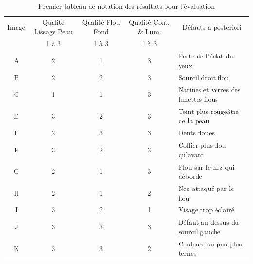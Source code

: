 \documentclass[11pt, french,screen]{report-rd-info}
\begin{document}
\begin{table}[htbp]
\centering
\caption{Premier tableau de notation des résultats pour l'évaluation}
\begin{tabular}{|c|c|c|c|p{3cm}|}
\hline
\multicolumn{ 1}{|c|}{Image} & Qualité Lissage Peau & Qualité Flou Fond & Qualité Cont. \& Lum. & \multicolumn{ 1}{c|}{Défauts a posteriori} \\ \cline{ 2- 4}
\multicolumn{ 1}{|c|}{} & 1 à 3 & 1 à 3 & 1 à 3 & \multicolumn{ 1}{c|}{} \\ \hline
A & 2 & 1 & 3 & Perte de l'éclat des yeux \\ \hline
B & 2 & 2 & 3 & Sourcil droit flou \\ \hline
C & 1 & 1 & 3 & Narines et verres des lunettes flous \\ \hline
D & 3 & 2 & 3 & Teint plus rougeâtre de la peau \\ \hline
E & 2 & 3 & 3 & Dents floues \\ \hline
F & 3 & 2 & 3 & Collier plus flou qu'avant \\ \hline
G & 2 & 1 & 3 & Flou sur le nez qui déborde \\ \hline
H & 2 & 1 & 2 & Nez  attaqué par le flou \\ \hline
I & 3 & 2 & 1 & Visage trop éclairé \\ \hline
J & 3 & 3 & 3 & Défaut au-dessus du sourcil gauche \\ \hline
K & 3 & 3 & 2 & Couleurs un peu plus ternes \\ \hline
\end{tabular}
\label{TableauEvaluation1}
\end{table}
\end{document}
